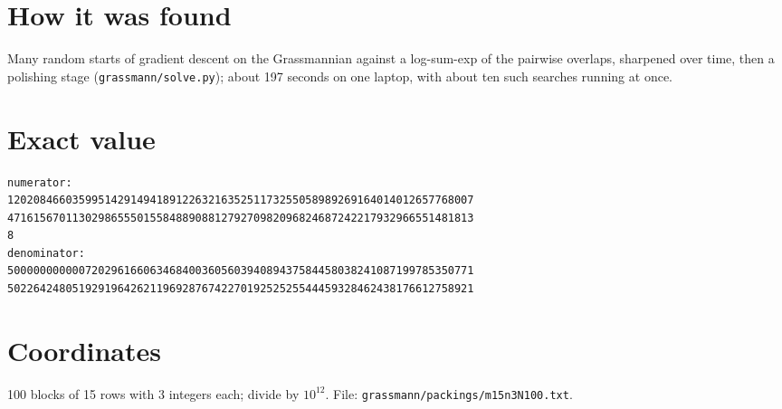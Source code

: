 \documentclass[11pt,a4paper]{article}
\begin{document}
\section{How it was found}
Many random starts of gradient descent on the Grassmannian against a log-sum-exp of the pairwise overlaps, sharpened over time, then a polishing stage (\texttt{grassmann/solve.py}); about 197 seconds on one laptop, with about ten such searches running at once.


\appendix
\section{Exact value}
{\small
\begin{verbatim}
numerator:
120208466035995142914941891226321635251173255058989269164014012657768007
471615670113029865550155848890881279270982096824687242217932966551481813
8
denominator:
500000000000720296166063468400360560394089437584458038241087199785350771
502264248051929196426211969287674227019252525544459328462438176612758921
\end{verbatim}}

\section{Coordinates}
100 blocks of 15 rows with 3 integers each; divide by $10^{12}$. File: \texttt{grassmann/packings/m15n3N100.txt}.
{\tiny
\begin{multicols}{3}
\end{multicols}}
\end{document}

